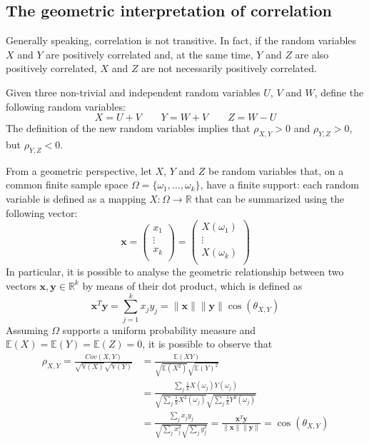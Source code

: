 \documentclass{report}
\begin{document}
\subsection{The geometric interpretation of correlation}
Generally speaking, correlation is not transitive. \newline
In fact, if the random variables $\displaystyle X$ and $\displaystyle Y$ are positively correlated and, at the same time, $\displaystyle Y$ and $\displaystyle Z$ are also positively correlated, $\displaystyle X$ and $\displaystyle Z$ are not necessarily positively correlated.
\begin{examplebox}
    Given three non-trivial and independent random variables $\displaystyle U$, $\displaystyle V$ and $\displaystyle W$, define the following random variables:
    \[X = U + V \quad\quad Y = W + V \quad\quad Z = W - U\]
    The definition of the new random variables implies that $\displaystyle \rho_{X, Y} > 0$ and $\displaystyle \rho_{Y, Z} > 0$, but $\displaystyle \rho_{Y, Z} < 0$.
\end{examplebox}
\noindent From a geometric perspective, let $\displaystyle X$, $\displaystyle Y$ and $\displaystyle Z$ be random variables that, on a common finite sample space $\displaystyle \Omega = \{\omega_1, \dots, \omega_k\}$, have a finite support: each random variable is defined as a mapping $\displaystyle X: \Omega \to \mathbb{R}$ that can be summarized using the following vector:
\[\mathbf{x} = \begin{pmatrix}
    x_1 \\
    \vdots \\
    x_k \\
\end{pmatrix} = \begin{pmatrix}
    X(\omega_1) \\
    \vdots \\
    X(\omega_k) \\
\end{pmatrix}\]
In particular, it is possible to analyse the geometric relationship between two vectors $\displaystyle \mathbf{x}, \mathbf{y} \in \mathbb{R}^k$ by means of their dot product, which is defined as
\[\mathbf{x}^T\mathbf{y} = \sum_{j = 1}^k x_jy_j = \lVert \mathbf{x} \rVert\lVert \mathbf{y} \rVert \cos(\theta_{X, Y})\]
Assuming $\displaystyle \Omega$ supports a uniform probability measure and $\displaystyle \mathbb{E}(X) = \mathbb{E}(Y) = \mathbb{E}(Z) = 0$, it is possible to observe that
\begin{align*}
    \rho_{X, Y} = \frac{Cov(X, Y)}{\sqrt{\mathbb{V}(X)}\sqrt{\mathbb{V}(Y)}}
        &= \frac{\mathbb{E}(XY)}{\sqrt{\mathbb{E}(X^2)}\sqrt{\mathbb{E}(Y)^2}} \\
        &= \frac{\sum_{j} \frac{1}{k} X(\omega_j)Y(\omega_j)}{\sqrt{\sum_j \frac{1}{k} X^2(\omega_j)}\sqrt{\sum_j \frac{1}{k} Y^2(\omega_j)}} \\
        &= \frac{\sum_j x_jy_j}{\sqrt{\sum_j x_j^2}\sqrt{\sum_j y_j^2}} = \frac{\mathbf{x}^T\mathbf{y}}{\lVert \mathbf{x} \rVert\lVert \mathbf{y} \rVert} = \cos(\theta_{X, Y})
\end{align*}
\end{document}
